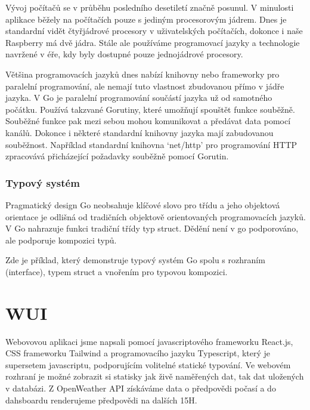 \documentclass[12pt,a4paper]{article}
\begin{document}
Vývoj počítačů se v průběhu posledního desetiletí značně posunul. V minulosti aplikace běžely na počítačích pouze s jediným procesorovým jádrem. Dnes je standardní vidět čtyřjádrové procesory v uživatelských počítačích, dokonce i naše Raspberry má dvě jádra. Stále ale používáme programovací jazyky a technologie navržené v éře, kdy byly dostupné pouze jednojádrové procesory.

Většina programovacích jazyků dnes nabízí knihovny nebo frameworky pro \linebreak paralelní programování, ale nemají tuto vlastnost zbudovanou přímo v jádře jazyka. V Go je paralelní programování součástí jazyka už od samotného počátku. Používá takzvané Gorutiny, které umožňují spouštět funkce souběžně. Souběžné funkce pak mezi sebou mohou komunikovat a předávat data pomocí kanálů. Dokonce i některé standardní knihovny jazyka mají zabudovanou souběžnost. Například standardní knihovna `net/http' pro programování HTTP zpracovává přicházející požadavky souběžně pomocí Gorutin.

\subsubsection{Typový systém}

Pragmatický design Go neobsahuje klíčové slovo pro třídu a jeho objektová orientace je odlišná od tradičních objektově orientovaných programovacích jazyků. V Go nahrazuje funkci tradiční třídy typ struct. Dědění není v go podporováno, ale podporuje kompozici typů.

Zde je příklad, který demonstruje typový systém Go spolu s rozhraním (interface), typem struct a vnořením pro typovou kompozici.


\clearpage


\section{WUI}

Webovovou aplikaci jsme napsali pomocí javascriptového frameworku React.js, CSS frameworku Tailwind a programovacího jazyku Typescript, který je supersetem javascriptu, podporujícím volitelné statické typování. Ve webovém rozhraní je možné zobrazit si statisky jak živě naměřených dat, tak dat uložených v databázi. Z OpenWeather API získáváme data o předpovědi počasí a do dahsboardu renderujeme předpovědi na dalších 15H.
\end{document}
